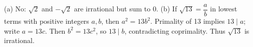 (a) No: $\sqrt2$ and $-\sqrt2$ are irrational but sum to 0. (b) If $\sqrt{13}=\dfrac{a}{b}$ in lowest terms with positive integers $a,b$, then $a^2=13b^2$. Primality of 13 implies $13\mid a$; write $a=13c$. Then $b^2=13c^2$, so $13\mid b$, contradicting coprimality. Thus $\sqrt{13}$ is irrational.
